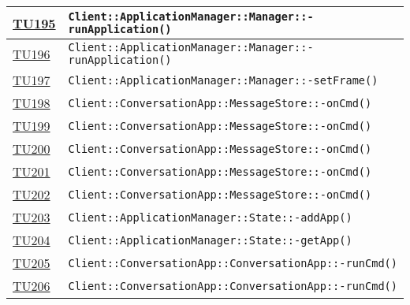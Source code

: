 \begin{longtable}{|>{\centering}m{1cm}|m{12cm}<{\centering}|}
\hyperlink{TU195}{TU195} & \texttt{Client::ApplicationManager::Manager::-\linebreak runApplication()}\\ \hline

\hyperlink{TU196}{TU196} & \texttt{Client::ApplicationManager::Manager::-\linebreak runApplication()}\\ \hline

\hyperlink{TU197}{TU197} & \texttt{Client::ApplicationManager::Manager::-\linebreak setFrame()}\\ \hline

\hyperlink{TU198}{TU198} & \texttt{Client::ConversationApp::MessageStore::-\linebreak onCmd()}\\ \hline

\hyperlink{TU199}{TU199} & \texttt{Client::ConversationApp::MessageStore::-\linebreak onCmd()}\\ \hline

\hyperlink{TU200}{TU200} & \texttt{Client::ConversationApp::MessageStore::-\linebreak onCmd()}\\ \hline

\hyperlink{TU201}{TU201} & \texttt{Client::ConversationApp::MessageStore::-\linebreak onCmd()}\\ \hline

\hyperlink{TU202}{TU202} & \texttt{Client::ConversationApp::MessageStore::-\linebreak onCmd()}\\ \hline

\hyperlink{TU203}{TU203} & \texttt{Client::ApplicationManager::State::-\linebreak addApp()}\\ \hline

\hyperlink{TU204}{TU204} & \texttt{Client::ApplicationManager::State::-\linebreak getApp()}\\ \hline

\hyperlink{TU205}{TU205} & \texttt{Client::ConversationApp::ConversationApp::-\linebreak runCmd()}\\ \hline

\hyperlink{TU206}{TU206} & \texttt{Client::ConversationApp::ConversationApp::-\linebreak runCmd()}\\ \hline


\end{longtable}
